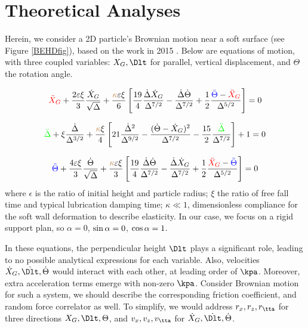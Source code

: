 \documentclass[fleqn,10pt]{InternshipReport-ENS-PSL}
\begin{document}

\section*{Theoretical Analyses}


Herein, we consider a 2D particle's Brownian motion near a soft surface (see Figure \ref{BEHDfig}), based on the work in 2015 \cite{JFM2015}. Below are equations of motion, with three coupled variables: $X_G, \Dlt$ for parallel, vertical displacement, and $\Theta$ the rotation angle.

$$ \textcolor{red}{\ddot{X}_G} + \frac{2\varepsilon \xi}{3} \frac{\dot{X}_G}{\sqrt\Delta} + \frac{\textcolor{brown}{\kappa} \varepsilon \xi}{6} \left[ \frac{19}{4} \frac{\dot\Delta \dot{X}_G}{\Delta^{7/2}} - \frac{\dot\Delta \dot\Theta}{\Delta^{7/2}} + \frac{1}{2} \frac{\textcolor{blue}{\ddot{\Theta}} - \textcolor{red}{\ddot{X}_G}}{\Delta^{5/2}} \right] = 0 $$

$$ \textcolor{green}{\ddot{\Delta}} + \xi \frac{\dot{\Delta}}{\Delta^{3/2}} + \frac{\textcolor{brown}{\kappa} \xi}{4} \left[ 21 \frac{\dot{\Delta}^2}{\Delta^{9/2}} - \frac{(\dot\Theta - \dot{X}_G)^2}{\Delta^{7/2}} - \frac{15}{2} \frac{\textcolor{green}{\ddot{\Delta}}}{\Delta^{7/2}} \right] + 1 = 0  $$

$$ \textcolor{blue}{\ddot{\Theta}} + \frac{4\varepsilon\xi}{3} \frac{\dot\Theta}{\sqrt\Delta} + \frac{\textcolor{brown}{\kappa} \varepsilon \xi}{3} \left[ \frac{19}{4} \frac{\dot\Delta \dot\Theta}{\Delta^{7/2}} - \frac{\dot\Delta \dot{X}_G}{\Delta^{7/2}} + \frac{1}{2} \frac{\textcolor{red}{\ddot{X}_G} - \textcolor{blue}{\ddot{\Theta}}}{\Delta^{5/2}} \right] = 0  $$
\normalsize
where $\epsilon$ is the ratio of initial height and particle radius;
$\xi$ the ratio of free fall time and typical lubrication damping time;
$\kappa \ll 1$, dimensionless compliance for the soft wall deformation to describe elasticity.
In our case, we focus on a rigid support plan, so $\alpha=0$, $\sin\alpha = 0$, $\cos\alpha = 1$.

In these equations, the perpendicular height $\Dlt$ plays a significant role, leading to no possible analytical expressions for each variable. Also, velocities $\dot{X}_G, \dot{\Dlt}, \dot{\Theta}$ would interact with each other, at leading order of $\kpa$. Moreover, extra acceleration terms emerge with non-zero $\kpa$. Consider Brownian motion for such a system, we should describe the corresponding friction coefficient, and random force correlator as well. To simplify, we would address $r_x, r_z, r_\tta$ for three directions $X_G, \Dlt, \Theta$, and $v_x, v_z, v_\tta$ for $\dot{X}_G, \dot{\Dlt}, \dot{\Theta}$.
\end{document}
